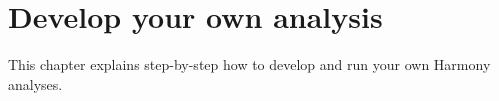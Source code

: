 \chapter{Develop your own analysis}\label{chap:DevelopNewAnalyses}

This chapter explains step-by-step how to develop and run your own Harmony analyses.



%
%		
%
%
%
%
%

